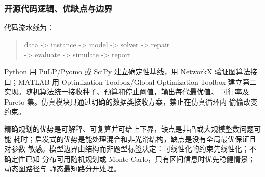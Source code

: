 \subsubsection{开源代码逻辑、优缺点与边界}

代码流水线为：
\begin{quote}
\small\ttfamily
data -> instance -> model -> solver -> repair\\
-> evaluate -> simulate -> report
\end{quote}
Python 用 PuLP/Pyomo 或 SciPy 建立确定性基线，用
NetworkX 验证图算法接口；MATLAB 用 Optimization Toolbox/Global Optimization
Toolbox 建立第二实现。随机算法统一接收种子、预算和停止阈值，输出每代最优值、
可行率及 Pareto 集。仿真模块只通过明确的数据类接收方案，禁止在仿真循环内
偷偷改变约束。

精确规划的优势是可解释、可复算并可给上下界，缺点是非凸或大规模整数问题可能
耗时；启发式的优势是能处理混合和非光滑结构，缺点是没有全局最优保证且对参数
敏感。模型边界由结构而非题型标签决定：可线性化的约束先线性化；不确定性已知
分布可用随机规划或 Monte Carlo，只有区间信息时优先稳健情景；动态图路径与
静态最短路分开处理。

